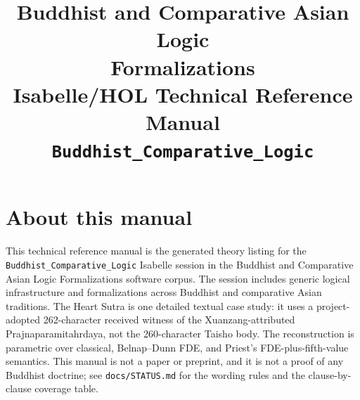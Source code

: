 \documentclass[11pt,a4paper]{article}
\begin{document}
\title{Buddhist and Comparative Asian Logic\\
Formalizations\\
Isabelle/HOL Technical Reference Manual\\[0.5ex]
\large\texttt{Buddhist\_Comparative\_Logic}}
\author{}
\date{}
\maketitle

\section*{About this manual}
This technical reference manual is the generated theory listing for the
\texttt{Buddhist\_Comparative\_Logic} Isabelle session in the Buddhist and
Comparative Asian Logic Formalizations software corpus. The session includes
generic logical infrastructure and formalizations across Buddhist and
comparative Asian traditions. The Heart Sutra is one detailed textual case
study: it uses a project-adopted 262-character received witness of the
Xuanzang-attributed Prajnaparamitahrdaya, not the 260-character Taisho body.
The reconstruction is parametric over classical, Belnap--Dunn FDE, and
Priest's FDE-plus-fifth-value semantics. This manual is not a paper or
preprint, and it is not a proof of any Buddhist doctrine; see
\texttt{docs/STATUS.md} for the wording rules and the clause-by-clause
coverage table.

\tableofcontents



\nocite{*}


\end{document}
